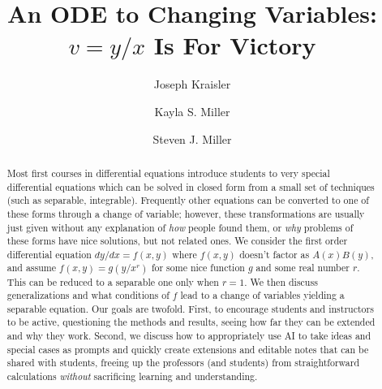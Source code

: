 \documentclass[12pt,reqno]{amsart}
\theoremstyle{plain}
\numberwithin{equation}{section} %
\numberwithin{table}{section} %
\numberwithin{figure}{section}
\begin{document}
\setcounter{page}{1}

\title{An ODE to Changing Variables: $v = y/x$ Is For Victory}

\author[J. Kraisler]{Joseph Kraisler}
\address{Department of Mathematics, Williams College, Williamstown, MA 01267, USA}


\author[K. S. Miller]{Kayla S. Miller}
\address{Department of Mathematics, Williams College, Williamstown, MA 01267, USA}

\author[S. J. Miller]{Steven J. Miller}
\address{Department of Mathematics, Williams College, Williamstown, MA 01267, USA}



\maketitle


\bigskip

\begin{abstract} Most first courses in differential equations introduce students to very special differential equations which can be solved in closed form from a small set of techniques (such as separable, integrable). Frequently other equations can be converted to one of these forms through a change of variable; however, these transformations are usually just given without any explanation of \emph{how} people found them, or \emph{why} problems of these forms have nice solutions, but not related ones. We consider the first order differential equation $dy/dx = f(x,y)$ where $f(x,y)$ doesn't factor as $A(x)B(y)$, and assume $f(x,y) = g(y/x^r)$ for some nice function $g$ and some real number $r$. This can be reduced to a separable one only when $r=1$. We then discuss generalizations and what conditions of $f$ lead to a change of variables yielding a separable equation. Our goals are twofold. First, to encourage students and instructors to be active, questioning the methods and results, seeing how far they can be extended and why they work. Second, we discuss how to appropriately use AI to take ideas and special cases as prompts and quickly create extensions and editable notes that can be shared with students, freeing up the professors (and students) from straightforward calculations \emph{without} sacrificing learning and understanding.
\end{abstract}
\end{document}
